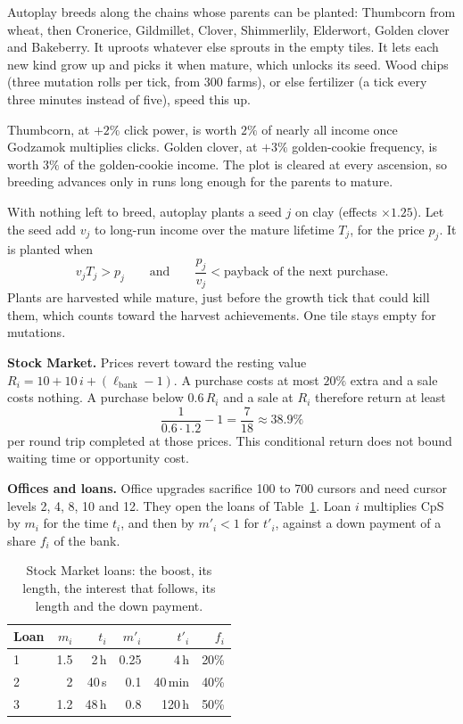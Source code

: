 \documentclass[11pt,a4paper]{article}
\numberwithin{equation}{section}
\theoremstyle{definition}
\theoremstyle{remark}
\newcommand{\proofstep}[1]{\par\addvspace{\medskipamount}\noindent\textbf{#1}\enspace\ignorespaces}
\begin{document}
Autoplay breeds along the chains whose parents can be planted: Thumbcorn from wheat, then Cronerice, Gildmillet, Clover, Shimmerlily, Elderwort, Golden clover and Bakeberry. It uproots whatever else sprouts in the empty tiles. It lets each new kind grow up and picks it when mature, which unlocks its seed. Wood chips (three mutation rolls per tick, from 300 farms), or else fertilizer (a tick every three minutes instead of five), speed this up.

Thumbcorn, at $+2\%$ click power, is worth $2\%$ of nearly all income once Godzamok multiplies clicks. Golden clover, at $+3\%$ golden-cookie frequency, is worth $3\%$ of the golden-cookie income. The plot is cleared at every ascension, so breeding advances only in runs long enough for the parents to mature.

With nothing left to breed, autoplay plants a seed $j$ on clay (effects $\times1.25$). Let the seed add $v_j$ to long-run income over the mature lifetime $T_j$, for the price $p_j$. It is planted when
\begin{equation}\label{eq:plant}
 v_jT_j>p_j\qquad\text{and}\qquad\frac{p_j}{v_j}<\text{payback of the next purchase}.
\end{equation}
Plants are harvested while mature, just before the growth tick that could kill them, which counts toward the harvest achievements. One tile stays empty for mutations.

\proofstep{Stock Market.} Prices revert toward the resting value $R_i=10+10\,i+(\ell_{\mathrm{bank}}-1)$. A purchase costs at most $20\%$ extra and a sale costs nothing. A purchase below $0.6\,R_i$ and a sale at $R_i$ therefore return at least
\begin{equation}\label{eq:market}
 \frac1{0.6\cdot1.2}-1=\frac7{18}\approx38.9\%
\end{equation}
per round trip completed at those prices. This conditional return does not bound waiting time or opportunity cost.

\proofstep{Offices and loans.} Office upgrades sacrifice 100 to 700 cursors and need cursor levels 2, 4, 8, 10 and 12. They open the loans of Table~\ref{tab:loans}. Loan $i$ multiplies CpS by $m_i$ for the time $t_i$, and then by $m'_i<1$ for $t'_i$, against a down payment of a share $f_i$ of the bank.

\begin{table}[t]
\centering
\small
\begin{tabular}{@{}lrrrrr@{}}
\toprule
Loan & $m_i$ & $t_i$ & $m'_i$ & $t'_i$ & $f_i$ \\
\midrule
1 & 1.5 & 2\,h & 0.25 & 4\,h & 20\% \\
2 & 2 & 40\,s & 0.1 & 40\,min & 40\% \\
3 & 1.2 & 48\,h & 0.8 & 120\,h & 50\% \\
\bottomrule
\end{tabular}
\caption{Stock Market loans: the boost, its length, the interest that follows, its length and the down payment.}
\label{tab:loans}
\end{table}
\end{document}
